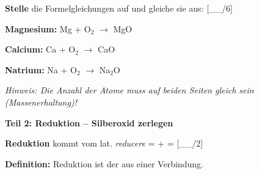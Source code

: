 \documentclass[10pt, a4paper]{article}
\newcommand{\luecke}[1]{\underline{\hspace{#1}}}
\newcommand{\punktebox}[1]{\hfill\small\textcolor{mittelgrau}{[\_\_/#1]}}
\newcommand{\operator}[1]{\textbf{\textcolor{fachfarbe}{#1}}}
\begin{document}
\begin{merkkasten}
\operator{Stelle} die Formelgleichungen auf und gleiche sie aus: \punktebox{6}

\vspace{4pt}
\textbf{Magnesium:} \hspace{1em} \luecke{0.6cm} Mg + O$_2$ $\longrightarrow$ \luecke{0.6cm} MgO

\vspace{4pt}
\textbf{Calcium:} \hspace{1.5em} \luecke{0.6cm} Ca + O$_2$ $\longrightarrow$ \luecke{0.6cm} CaO

\vspace{4pt}
\textbf{Natrium:} \hspace{1.5em} \luecke{0.6cm} Na + O$_2$ $\longrightarrow$ \luecke{0.6cm} Na$_2$O

\vspace{2pt}
{\small\textit{Hinweis: Die Anzahl der Atome muss auf beiden Seiten gleich sein (Massenerhaltung)!}}
\end{merkkasten}

\vspace{2pt}


\begin{teilbox}
\textbf{\textcolor{fachfarbe}{Teil 2: Reduktion – Silberoxid zerlegen}}
\end{teilbox}

\vspace{-2pt}

\begin{merkkasten}
\textbf{Reduktion} kommt vom lat. \textit{reducere} = \luecke{1cm} + \luecke{1.5cm} = \luecke{2.5cm} \punktebox{2}

\vspace{3pt}
\textbf{Definition:} Reduktion ist der \luecke{4cm} aus einer Verbindung.
\end{merkkasten}
\end{document}
